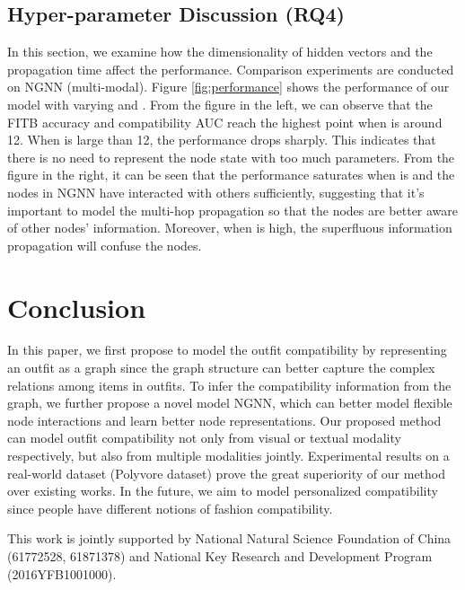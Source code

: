 \documentclass[sigconf]{acmart}
\begin{document}
\subsection{Hyper-parameter Discussion (RQ4)}


In this section, we examine how the dimensionality of hidden vectors  and the propagation time  affect the performance. Comparison experiments are conducted on NGNN (multi-modal).
Figure \ref{fig:performance} shows the performance of our model with varying  and .
From the figure in the left, we can observe that the FITB accuracy and compatibility AUC reach the highest point when  is around 12. When  is large than 12, the performance drops sharply. This indicates that there is no need to represent the node state with too much parameters.
From the figure in the right, it can be seen that the performance saturates when  is  and the nodes in NGNN have interacted with others sufficiently, suggesting that it's important to model the multi-hop propagation so that the nodes are better aware of other nodes' information. Moreover, when  is high, the superfluous information propagation will confuse the nodes.





\section{Conclusion}
In this paper, we first propose to model the outfit compatibility by representing an outfit as a graph since the graph structure can better capture the complex relations among items in outfits.
To infer the compatibility information from the graph, we further propose a novel model NGNN, which can better model flexible node interactions and learn better node representations.
Our proposed method can model outfit compatibility not only from visual or textual modality respectively, but also from multiple modalities jointly.
Experimental results on a real-world dataset (Polyvore dataset) prove the great superiority of our method over existing works.
In the future, we aim to model personalized compatibility since people have different notions of fashion compatibility.


\begin{acks}
This work is jointly supported by National Natural Science Foundation of China (61772528, 61871378) and National Key Research and Development Program (2016YFB1001000).
\end{acks}




 

\balance

\end{document}
